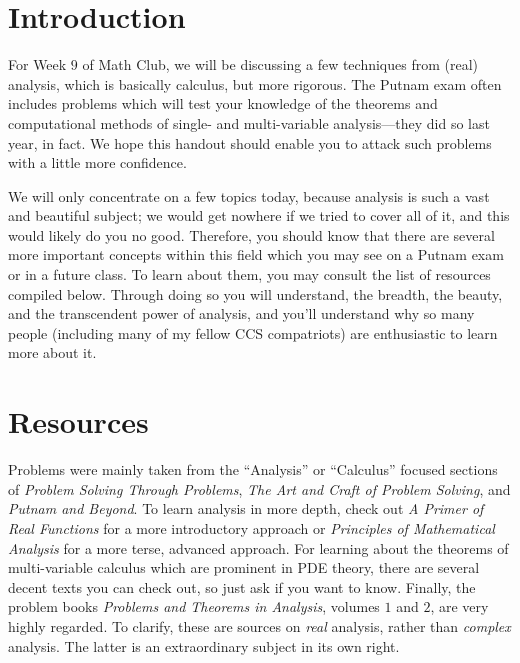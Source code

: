 \documentclass{article}
\theoremstyle{definition}
\theoremstyle{remark}
\begin{document}

\section{Introduction}
For Week $9$ of Math Club, we will be discussing a few techniques from (real) analysis, which is basically calculus, but more rigorous. The Putnam exam often includes problems which will test your knowledge of the theorems and computational methods of single- and multi-variable analysis---they did so last year, in fact. We hope this handout should enable you to attack such problems with a little more confidence.

We will only concentrate on a few topics today, because analysis is such a vast and beautiful subject; we would get nowhere if we tried to cover all of it, and this would likely do you no good. Therefore, you should know that there are several more important concepts within this field which you may see on a Putnam exam or in a future class. To learn about them, you may consult the list of resources compiled below. Through doing so you will understand, the breadth, the beauty, and the transcendent power of analysis, and you'll understand why so many people (including many of my fellow CCS compatriots) are enthusiastic to learn more about it.

\section{Resources}
Problems were mainly taken from the ``Analysis'' or ``Calculus'' focused sections of \emph{Problem Solving Through Problems}, \emph{The Art and Craft of Problem Solving}, and \emph{Putnam and Beyond}. To learn analysis in more depth, check out \emph{A Primer of Real Functions} for a more introductory approach or \emph{Principles of Mathematical Analysis} for a more terse, advanced approach. For learning about the theorems of multi-variable calculus which are prominent in PDE theory, there are several decent texts you can check out, so just ask if you want to know. Finally, the problem books \emph{Problems and Theorems in Analysis}, volumes $1$ and $2$, are very highly regarded. To clarify, these are sources on \emph{real} analysis, rather than \emph{complex} analysis. The latter is an extraordinary subject in its own right.
\end{document}
